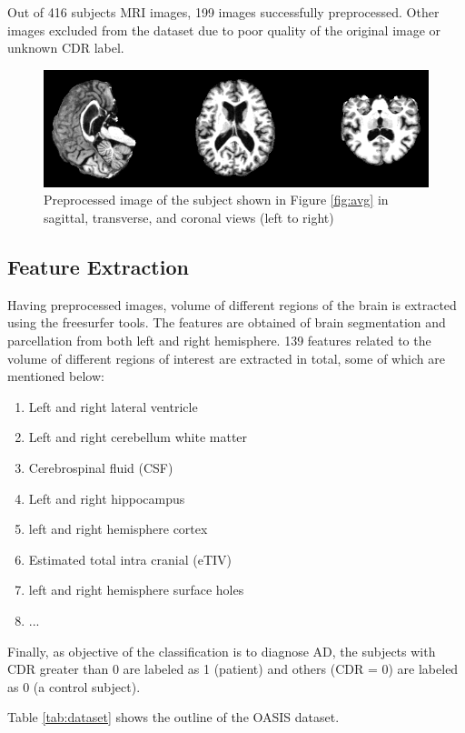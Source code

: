 Out of 416 subjects MRI images, 199 images successfully preprocessed. Other images excluded from the dataset due to poor quality of the original image or unknown CDR label.

\begin{figure}
	\centering
	\includegraphics[width=\columnwidth]{images/preprocessed.png}
	\caption{Preprocessed image of the subject shown in Figure \ref{fig:avg} in sagittal, transverse, and coronal views (left to right)}
	\label{fig:pre}
\end{figure} 

\subsection{Feature Extraction}
Having preprocessed images, volume of different regions of the brain is extracted using the freesurfer tools. The features are obtained of brain segmentation and parcellation from both left and right hemisphere. 139 features related to the volume of different regions of interest are extracted in total, some of which are mentioned below:

\begin{enumerate}
	\item Left and right lateral ventricle
	\item Left and right cerebellum white matter
	\item Cerebrospinal fluid (CSF)
	\item Left and right hippocampus
	\item left and right hemisphere cortex
	\item Estimated total intra cranial (eTIV)
	\item left and right hemisphere surface holes
	\item ...
\end{enumerate}

Finally, as objective of the classification is to diagnose AD, the subjects with CDR greater than 0 are labeled as 1 (patient) and others (CDR = 0) are labeled as 0 (a control subject).

Table \ref{tab:dataset} shows the outline of the OASIS dataset.

